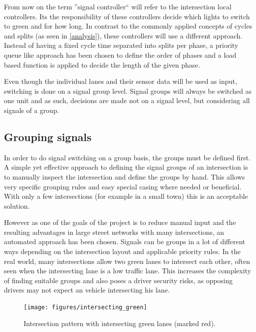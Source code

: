 From now on the term ''signal controller`` will refer to the intersection local controllers. Its the responsibility of these controllers decide which lights to switch to green and for how long. In contrast to the commonly applied concepts of cycles and splits (as seen in \autoref{analysis}), these controllers will use a different approach. Instead of having a fixed cycle time separated into splits per phase, a priority queue like approach has been chosen to define the order of phases and a load based function is applied to decide the length of the given phase.

Even though the individual lanes and their sensor data will be used as input, switching is done on a signal group level. Signal groups will always be switched as one unit and as such, decisions are made not on a signal level, but considering all signals of a group.

\subsection*{Grouping signals}
\label{signal_group_concept}

In order to do signal switching on a group basis, the groups must be defined first. A simple yet effective approach to defining the signal groups of an intersection is to manually inspect the intersection and define the groups by hand. This allows very specific grouping rules and easy special casing where needed or beneficial. With only a few intersections (for example in a small town) this is an acceptable solution.

However as one of the goals of the project is to reduce manual input and the resulting advantages in large street networks with many intersections, an automated approach has been chosen. Signals can be groups in a lot of different ways depending on the intersection layout and applicable priority rules. In the real world, many intersections allow two green lanes to intersect each other, often seen when the intersecting lane is a low traffic lane. This increases the complexity of finding suitable groups and also poses a driver security risks, as opposing drivers may not expect an vehicle intersecting his lane.

\begin{figure}[!ht]
	\centering
	\texttt{[image: figures/intersecting\_green]}
	\label{intersecting_green}
	\caption{Intersection pattern with intersecting green lanes (marked red).}
\end{figure}

